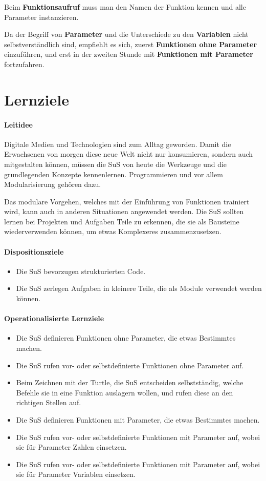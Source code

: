 \documentclass{article}
\begin{document}
Beim \textbf{Funktionsaufruf} muss man den Namen der Funktion kennen und alle Parameter instanzieren.

Da der Begriff von \textbf{Parameter} und die Unterschiede zu den \textbf{Variablen} nicht selbstverständlich sind, empfiehlt es sich, zuerst \textbf{Funktionen ohne Parameter} einzuführen, und erst in der zweiten Stunde mit \textbf{Funktionen mit Parameter} fortzufahren.

\section{Lernziele}

\paragraph{Leitidee}
Digitale Medien und Technologien sind zum Alltag geworden. Damit die Erwachsenen von morgen diese neue Welt nicht nur konsumieren, sondern auch mitgestalten können, müssen die SuS von heute die Werkzeuge und die grundlegenden Konzepte kennenlernen. Programmieren und vor allem Modularisierung gehören dazu.

Das modulare Vorgehen, welches mit der Einführung von Funktionen trainiert wird, kann auch in anderen Situationen angewendet werden. Die SuS sollten lernen bei Projekten und Aufgaben Teile zu erkennen, die sie als Bausteine wiederverwenden können, um etwas Komplexeres zusammenzusetzen.

\paragraph{Dispositionsziele}
\begin{itemize}
\item Die SuS bevorzugen strukturierten Code.
\item Die SuS zerlegen Aufgaben in kleinere Teile, die als Module verwendet werden können.
\end{itemize}
\paragraph{Operationalisierte Lernziele}
\begin{itemize}
\item Die SuS definieren Funktionen ohne Parameter, die etwas Bestimmtes machen.
\item Die SuS rufen vor- oder selbstdefinierte Funktionen ohne Parameter auf.
\item Beim Zeichnen mit der Turtle, die SuS entscheiden selbstständig, welche Befehle sie in eine Funktion auslagern wollen, und rufen diese an den richtigen Stellen auf.
\item Die SuS definieren Funktionen mit Parameter, die etwas Bestimmtes machen.
\item Die SuS rufen vor- oder selbstdefinierte Funktionen mit Parameter auf, wobei sie für Parameter Zahlen einsetzen.
\item Die SuS rufen vor- oder selbstdefinierte Funktionen mit Parameter auf, wobei sie für Parameter Variablen einsetzen.
\end{itemize}
\end{document}
